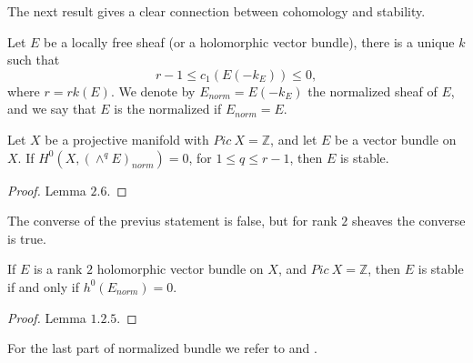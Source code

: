 \documentclass[
	oldfontcommands,
	sumario=abnt-6027-2012,
	12pt,			%
	openright,		%
	oneside,		%
	a4paper,		%
	english,		%
	brazil			%
	]{imecc-unicamp}
\begin{document}
The next result gives a clear connection between cohomology and stability.

\begin{definition}
	Let $E$ be a locally free sheaf (or a holomorphic vector bundle), there is a unique $k$ such that $$
	r-1\le c_1(E(-k_E))\le 0,
	$$ 
	where $r=rk (E)$. We denote by $E_{norm}=E(-k_E)$ the normalized sheaf of $E$, and we say that $E$ is the normalized if $E_{norm}=E$.
\end{definition}
\begin{teorema}[Hoppe]
	Let $X$ be a projective manifold with $Pic~X=\mathbb Z$, and let $E$ be a vector bundle on $X$. If $H^0(X,(\wedge^q E)_{norm})=0$, for $1\le q\le r-1$, then $E$ is stable.
\end{teorema}
\begin{proof}
	\cite{Hoppe1984} Lemma $2.6$.
\end{proof}
The converse of the previus statement is false, but for rank $2$ sheaves the converse is true.
\begin{teorema}
	If $E$ is a rank $2$ holomorphic vector bundle on $X$, and $Pic~X=\mathbb Z$, then $E$ is stable if and only if $h^0(E_{norm})=0$.
\end{teorema}
\begin{proof}
	\cite{Okonek} Lemma $1.2.5$.
\end{proof}

For the last part of normalized bundle we refer to \cite{jardim} and \cite{Ottaviani}.
\end{document}
